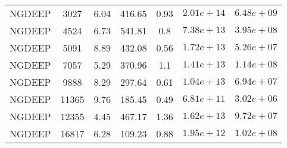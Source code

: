\begin{table}
\begin{tabular}{ccccccc}
NGDEEP & 3027 & 6.04 & 416.65 & 0.93 & $2.01e+14$ & $6.48e+09$ \\
NGDEEP & 4524 & 6.73 & 541.81 & 0.8 & $7.38e+13$ & $3.95e+08$ \\
NGDEEP & 5091 & 8.89 & 432.08 & 0.56 & $1.72e+13$ & $5.26e+07$ \\
NGDEEP & 7057 & 5.29 & 370.96 & 1.1 & $1.41e+13$ & $1.14e+08$ \\
NGDEEP & 9888 & 8.29 & 297.64 & 0.61 & $1.04e+13$ & $6.94e+07$ \\
NGDEEP & 11365 & 9.76 & 185.45 & 0.49 & $6.81e+11$ & $3.02e+06$ \\
NGDEEP & 12355 & 4.45 & 467.17 & 1.36 & $1.62e+13$ & $9.72e+07$ \\
NGDEEP & 16817 & 6.28 & 109.23 & 0.88 & $1.95e+12$ & $1.02e+08$ \\
\end{tabular}
\end{table}
